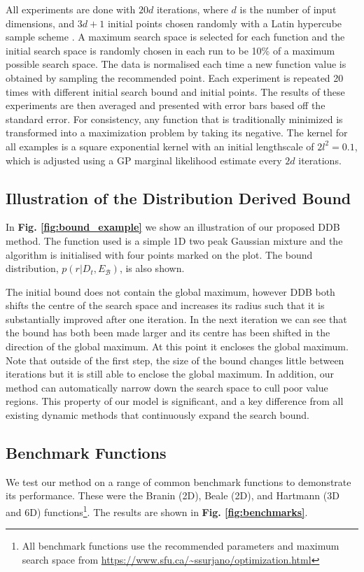 \documentclass[preprint]{elsarticle}
\begin{document}
All experiments are done with $20d$ iterations, where $d$ is the number of input dimensions, and $3d +1$ initial points chosen randomly with a Latin hypercube sample scheme \citep{jones2001taxonomy}. A maximum search space is selected for each function and the initial search space is randomly chosen in each run to be 10\% of a maximum possible search space. The data is normalised each time a new function value is obtained by sampling the recommended point. Each experiment is repeated 20 times with different initial search bound and initial points. The results of these experiments are then averaged and presented with error bars based off the standard error. For consistency, any function that is traditionally minimized is transformed into a maximization problem by taking its negative. The kernel for all examples is a square exponential kernel with an initial lengthscale of $2l^2=0.1$, which is adjusted using a GP marginal likelihood estimate every $2d$ iterations.

\subsection{Illustration of the Distribution Derived Bound}
In \textbf{Fig. \ref{fig:bound_example}} we show an illustration of our proposed DDB method. The function used is a simple 1D two peak Gaussian mixture and the algorithm is initialised with four points marked on the plot. The bound distribution, $p(r|D_t,E_{\mathcal{B}})$, is also shown.

The initial bound does not contain the global maximum, however DDB both shifts the centre of the search space and increases its radius such that it is substantially improved after one iteration. In the next iteration we can see that the bound has both been made larger and its centre has been shifted in the direction of the global maximum. At this point it encloses the global maximum. Note that outside of the first step, the size of the bound changes little between iterations but it is still able to enclose the global maximum. In addition, our method can automatically narrow down the search space to cull poor value regions. This property of our model is significant, and a key difference from all existing dynamic methods that continuously expand the search bound. 



\subsection{Benchmark Functions}
We test our method on a range of common benchmark functions to demonstrate its performance. These were the Branin (2D), Beale (2D), and Hartmann (3D and 6D) functions\footnote{All benchmark functions use the recommended parameters and maximum search space from \url{https://www.sfu.ca/~ssurjano/optimization.html}}. The results are shown in\textbf{ Fig. \ref{fig:benchmarks}}.  
\end{document}
